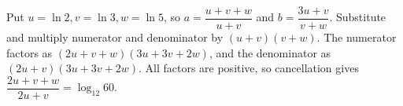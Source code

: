 Put $u=\ln2,v=\ln3,w=\ln5$, so $a=\dfrac{u+v+w}{u+v}$ and $b=\dfrac{3u+v}{v+w}$. Substitute and multiply numerator and denominator by $(u+v)(v+w)$. The numerator factors as $(2u+v+w)(3u+3v+2w)$, and the denominator as $(2u+v)(3u+3v+2w)$. All factors are positive, so cancellation gives $\dfrac{2u+v+w}{2u+v}=\boxed{\log_{12}60}$.
